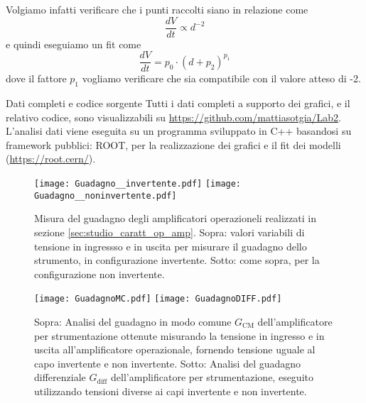 \documentclass[
    rmp,
    reprint, 
    superscriptaddress, 
    altaffilletter, 
    amsmath, 
    amssymb,
    a4paper]{revtex4-2}
\begin{document}
Volgiamo infatti verificare che i punti raccolti siano in relazione come 
\[
    \frac{dV}{dt} \propto d^{-2}
\]
e quindi eseguiamo un fit come
\[
    \frac{dV}{dt} = p_0\cdot(d+p_2)^{p_1}
\]
dove il fattore $p_1$ vogliamo verificare che sia compatibile con il valore atteso di -2.


\begin{methods}{D\lowercase{ati completi e codice sorgente}}
    Tutti i dati completi a supporto dei grafici, e il relativo codice, sono visualizzabili su \url{https://github.com/mattiasotgia/Lab2}. L'analisi dati viene eseguita su un programma sviluppato in C++ basandosi su framework pubblici: ROOT, per la realizzazione dei grafici e il fit dei modelli (\url{https://root.cern/}).
\end{methods}

\appendix

\renewcommand{\thetable}{S-\arabic{table}}
\renewcommand{\thefigure}{S-\arabic{figure}}
\begin{figure*}[p]
    \raggedright
    \texttt{[image: Guadagno\_\_invertente.pdf]}
    \texttt{[image: Guadagno\_\_noninvertente.pdf]}
    \caption{Misura del guadagno degli amplificatori operazioneli realizzati in sezione \ref{sec:studio_caratt_op_amp}. Sopra: valori variabili di tensione in ingressso e in uscita per misurare il guadagno dello strumento, in configurazione invertente. Sotto: come sopra, per la configurazione non invertente.}
    \label{fig:guadagno_inv_noninv}
\end{figure*}
\begin{figure*}
    \raggedright
    \texttt{[image: GuadagnoMC.pdf]}
    \texttt{[image: GuadagnoDIFF.pdf]}
    \caption{Sopra: Analisi del guadagno in modo comune $G_{\text{CM}}$ dell'amplificatore per strumentazione ottenute misurando la tensione in ingresso e in uscita all'amplificatore operazionale, fornendo tensione uguale al capo invertente e non invertente. Sotto: Analisi del guadagno differenziale $G_{\text{diff}}$ dell'amplificatore per strumentazione, eseguito utilizzando tensioni diverse ai capi invertente e non invertente.}
    \label{fig:guadagno_op_amp_strum}
\end{figure*}
\end{document}
